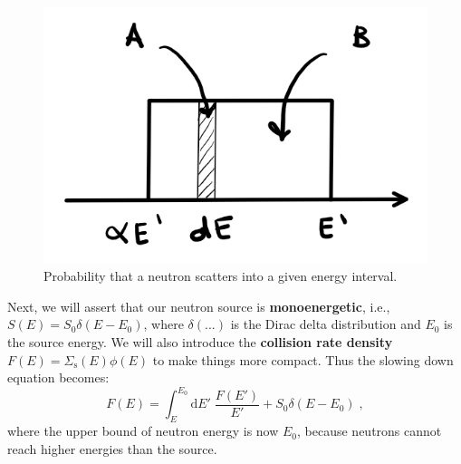 \begin{figure}[h]
  \centering
  \includegraphics[scale=0.7]{./Figures/P2/probdE.png} 
  \caption{Probability that a neutron scatters into a given energy interval.} 
  \label{fig:probdE}
\end{figure}

Next, we will assert that our neutron source is \textbf{monoenergetic}, i.e., $S(E) = S_0 \delta(E-E_0)$, where $\delta(...)$ is the Dirac delta distribution and $E_0$ is the source energy. We will also introduce the \textbf{collision rate density} $F(E) = \Sigma_\mathrm{s}(E)\phi(E)$ to make things more compact. Thus the slowing down equation becomes:
\begin{equation}\label{eq:slowdown_0}
    F(E) = \int^{E_0}_E\mathrm{d}E'\;\frac{F(E')}{E'} + S_0\delta(E-E_0)\;\mathrm{,}
\end{equation}
where the upper bound of neutron energy is now $E_0$, because neutrons cannot reach higher energies than the source.

